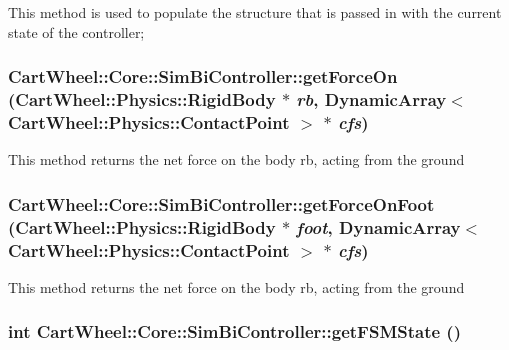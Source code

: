 This method is used to populate the structure that is passed in with the current state of the controller; \hypertarget{classCartWheel_1_1Core_1_1SimBiController_a5ccf149c4539ab094ac493288b412478}{
\subsubsection[{getForceOn}]{ CartWheel::Core::SimBiController::getForceOn ({\bf CartWheel::Physics::RigidBody} $\ast$ {\em rb}, \/  DynamicArray$<$ {\bf CartWheel::Physics::ContactPoint} $>$ $\ast$ {\em cfs})}}
\label{classCartWheel_1_1Core_1_1SimBiController_a5ccf149c4539ab094ac493288b412478}
This method returns the net force on the body rb, acting from the ground \hypertarget{classCartWheel_1_1Core_1_1SimBiController_acbdd73768f1429479ca16efdce9a1a90}{
\subsubsection[{getForceOnFoot}]{ CartWheel::Core::SimBiController::getForceOnFoot ({\bf CartWheel::Physics::RigidBody} $\ast$ {\em foot}, \/  DynamicArray$<$ {\bf CartWheel::Physics::ContactPoint} $>$ $\ast$ {\em cfs})}}
\label{classCartWheel_1_1Core_1_1SimBiController_acbdd73768f1429479ca16efdce9a1a90}
This method returns the net force on the body rb, acting from the ground \hypertarget{classCartWheel_1_1Core_1_1SimBiController_a658737de9749bd63f391a57376a84a19}{
\subsubsection[{getFSMState}]{\setlength{\rightskip}{0pt plus 5cm}int CartWheel::Core::SimBiController::getFSMState ()}}
